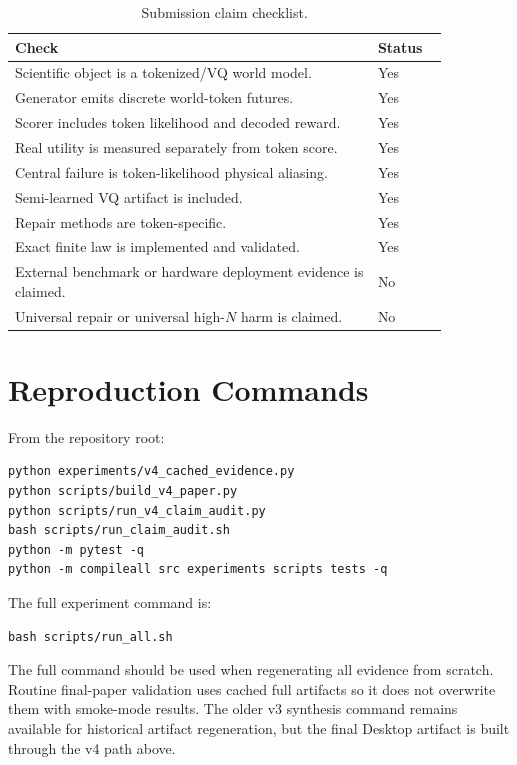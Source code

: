 \begin{table}[H]
\caption{Submission claim checklist.}
\label{tab:checklist}
\centering
\small
\begin{tabular}{@{}p{0.72\linewidth}p{0.14\linewidth}@{}}
\toprule
Check & Status \\
\midrule
Scientific object is a tokenized/VQ world model. & Yes \\
Generator emits discrete world-token futures. & Yes \\
Scorer includes token likelihood and decoded reward. & Yes \\
Real utility is measured separately from token score. & Yes \\
Central failure is token-likelihood physical aliasing. & Yes \\
Semi-learned VQ artifact is included. & Yes \\
Repair methods are token-specific. & Yes \\
Exact finite law is implemented and validated. & Yes \\
External benchmark or hardware deployment evidence is claimed. & No \\
Universal repair or universal high-$N$ harm is claimed. & No \\
\bottomrule
\end{tabular}
\end{table}

\section{Reproduction Commands}
\label{app:commands}

From the repository root:
\begin{verbatim}
python experiments/v4_cached_evidence.py
python scripts/build_v4_paper.py
python scripts/run_v4_claim_audit.py
bash scripts/run_claim_audit.sh
python -m pytest -q
python -m compileall src experiments scripts tests -q
\end{verbatim}
The full experiment command is:
\begin{verbatim}
bash scripts/run_all.sh
\end{verbatim}
The full command should be used when regenerating all evidence from scratch. Routine final-paper validation uses cached full artifacts so it does not overwrite them with smoke-mode results. The older v3 synthesis command remains available for historical artifact regeneration, but the final Desktop artifact is built through the v4 path above.

